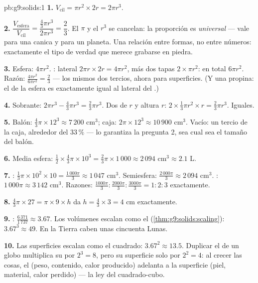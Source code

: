 \begin{solution}{pb:g9:solids:1}
\textbf{1.} $V_{\text{cil}} = \pi r^2 \times 2r = 2\pi r^3$.

\textbf{2.} $\dfrac{V_{\text{esfera}}}{V_{\text{cil}}}
= \dfrac{\frac43 \pi r^3}{2 \pi r^3} = \dfrac23$. El $\pi$ y
el $r^3$ se cancelan: la proporción es \emph{universal} --- vale
para una canica y para un planeta. Una relación entre formas, no
entre números: exactamente el tipo de verdad que merece grabarse en
piedra.

\textbf{3.} Esfera: $4\pi r^2$. : lateral
$2\pi r \times 2r = 4\pi r^2$, más dos tapas
$2 \times \pi r^2$: en total $6\pi r^2$. Razón:
$\frac{4\pi r^2}{6\pi r^2} = \frac23$ --- los mismos dos tercios,
ahora para superficies. (Y una propina: el  de la esfera es exactamente igual
al  lateral del .)

\textbf{4.} Sobrante: $2\pi r^3 - \frac43\pi r^3 =
\frac23 \pi r^3$. Dos  de  $r$ y altura $r$:
$2 \times \frac13 \pi r^2 \times r = \frac23 \pi r^3$. Iguales.

\textbf{5.} Balón: $\frac43 \pi \times 12^3 \approx 7\,200$
cm$^3$; caja: $2\pi \times 12^3 \approx 10\,900$ cm$^3$. Vacío:
un tercio de la caja, alrededor del $33\,\%$ --- lo garantiza la
pregunta 2, sea cual sea el tamaño del balón.

\textbf{6.} Media esfera:
$\frac12 \times \frac43 \pi \times 10^3 = \frac23 \pi \times
1\,000 \approx 2\,094$ cm$^3 \approx 2.1$ L.

\textbf{7.} : $\frac13 \pi \times 10^2 \times 10 =
\frac{1\,000\pi}{3} \approx 1\,047$ cm$^3$. Semiesfera:
$\frac{2\,000\pi}{3} \approx 2\,094$ cm$^3$. :
$1\,000\pi \approx 3\,142$ cm$^3$. Razones:
$\frac{1000\pi}{3} : \frac{2000\pi}{3} : \frac{3000\pi}{3}
= 1 : 2 : 3$ exactamente.

\textbf{8.} $\frac43 \pi \times 27 = \pi \times 9 \times h$
da $h = \frac43 \times 3 = 4$ cm exactamente.

\textbf{9.} : $\frac{6\,371}{1\,737} \approx 3.67$.
Los volúmenes escalan como el  (\cref{thm:g9:solids:scaling}):
$3.67^3 \approx 49$. En la Tierra caben unas cincuenta Lunas.

\textbf{10.} Las superficies escalan como el cuadrado: $3.67^2 \approx
13.5$. Duplicar el  de un globo multiplica su  por
$2^3 = 8$, pero su superficie solo por $2^2 = 4$: al crecer las cosas,
el  (peso, contenido, calor producido) adelanta a la superficie (piel,
material, calor perdido) --- la ley del cuadrado-cubo.


\end{solution}
